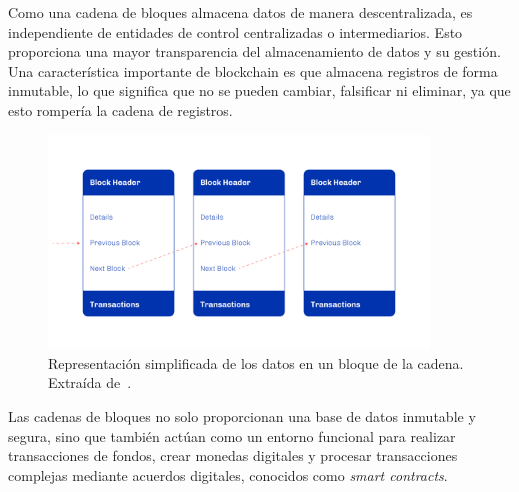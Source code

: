 \documentclass[12pt]{book}
\begin{document}
Como una cadena de bloques almacena datos de manera descentralizada, es independiente de entidades de control centralizadas o intermediarios. Esto proporciona una mayor transparencia del almacenamiento de datos y su gestión. Una característica importante de blockchain es que almacena registros de forma inmutable, lo que significa que no se pueden cambiar, falsificar ni eliminar, ya que esto rompería la cadena de registros.

\begin{figure}
	\centering
	\includegraphics[width=0.9\textwidth]{Bloques.png}
    \caption[Representación simplificada de los datos en un bloque de la cadena.]{Representación simplificada de los datos en un bloque de la cadena. Extraída de~\cite{plutus-smart-contracts}.}\label{fig:Bloques}
\end{figure}

Las cadenas de bloques no solo proporcionan una base de datos inmutable y segura, sino que también actúan como un entorno funcional para realizar transacciones de fondos, crear monedas digitales y procesar transacciones complejas mediante acuerdos digitales, conocidos como \textit{smart contracts}.


\end{document}
